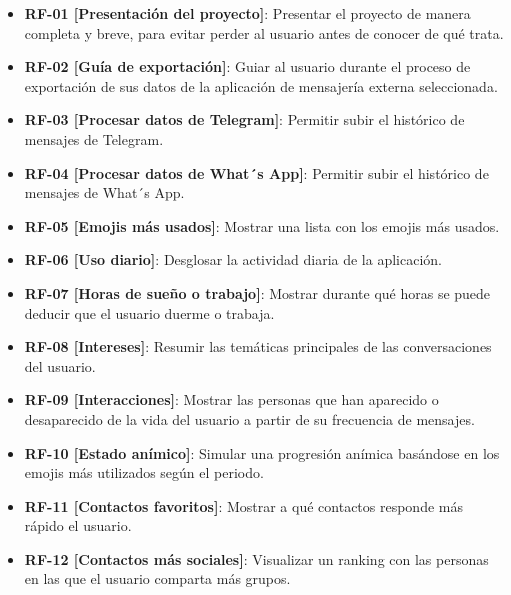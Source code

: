 
\begin{itemize}
    \item \textbf{RF-01 [Presentación del proyecto]}: Presentar el proyecto de manera completa y breve, para evitar perder al usuario antes de conocer de qué trata.
    \item \textbf{RF-02 [Guía de exportación]}: Guiar al usuario durante el proceso de exportación de sus datos de la aplicación de mensajería externa seleccionada.
    \item \textbf{RF-03 [Procesar datos de Telegram]}: Permitir subir el histórico de mensajes de Telegram.
    \item \textbf{RF-04 [Procesar datos de What´s App]}: Permitir subir el histórico de mensajes de What´s App.
    \item \textbf{RF-05 [Emojis más usados]}: Mostrar una lista con los emojis más usados.
    \item \textbf{RF-06 [Uso diario]}: Desglosar la actividad diaria de la aplicación.
    \item \textbf{RF-07 [Horas de sueño o trabajo]}: Mostrar durante qué horas se puede deducir que el usuario duerme o trabaja.
    \item \textbf{RF-08 [Intereses]}: Resumir las temáticas principales de las conversaciones del usuario.
    \item \textbf{RF-09 [Interacciones]}: Mostrar las personas que han aparecido o desaparecido de la vida del usuario a partir de su frecuencia de mensajes.
    \item \textbf{RF-10 [Estado anímico]}: Simular una progresión anímica basándose en los emojis más utilizados según el periodo.
    \item \textbf{RF-11 [Contactos favoritos]}: Mostrar a qué contactos responde más rápido el usuario.
    \item \textbf{RF-12 [Contactos más sociales]}: Visualizar un ranking con las personas en las que el usuario comparta más grupos.
\end{itemize}

